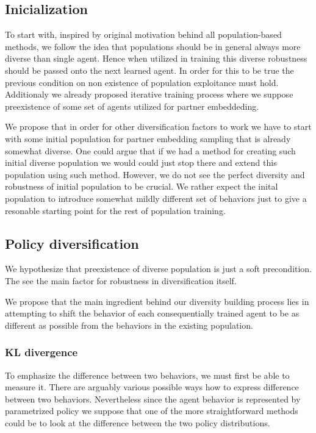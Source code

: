 \subsection{Inicialization}
To start with, inspired by original motivation behind all population-based methods, we follow the idea that populations should be in general always more diverse than single agent.
Hence when utilized in training this diverse robustness should be passed onto the next learned agent.
In order for this to be true the previous condition on non existence of population exploitance must hold.
Additionaly we already proposed iterative training process where we suppose preexistence of some set of agents utilized for partner embeddeding.

We propose that in order for other diversification factors to work we have to start with some initial population for partner embedding sampling that is already somewhat diverse.
One could argue that if we had a method for creating such initial diverse population we would could just stop there and extend this population using such method.
However, we do not see the perfect diversity and robustness of initial population to be crucial. 
We rather expect the inital population to introduce somewhat mildly different set of behaviors just to give a resonable starting point for the rest of population training.

\subsection{Policy diversification}
We hypothesize that preexistence of diverse population is just a soft precondition.
The see the main factor for robustness in diversification itself.

We propose that the main ingredient behind our diversity building process lies in attempting to shift the behavior of each consequentially trained agent to be as different as possible from the behaviors in the existing population.

\subsubsection{KL divergence}
To emphasize the difference between two behaviors, we must first be able to measure it.
There are arguably various possible ways how to express difference between two behaviors.
Nevertheless since the agent behavior is represented by parametrized policy we suppose that one of the more straightforward methods could be to look at the difference between the two policy distributions.


